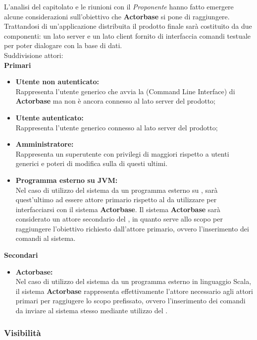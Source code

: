 \documentclass{scalatekids-article}
\begin{document}
L'analisi del capitolato e le riunioni con il \textit{Proponente} hanno fatto emergere
alcune considerazioni sull'obiettivo che \textbf{Actorbase} si pone di raggiungere.
Trattandosi di un'applicazione distribuita il prodotto finale sarà costituito
da due  componenti: un lato server e un lato client fornito di interfaccia
comandi testuale per poter dialogare con la base di dati.\\ Suddivisione attori:\\
\textbf{Primari}
\begin{itemize}
\item\textbf{Utente non autenticato:}\\
  Rappresenta l'utente generico che avvia la  (Command Line Interface) di \textbf{Actorbase} ma non è ancora connesso al lato server del prodotto;
\item\textbf{Utente autenticato:}\\
  Rappresenta l'utente generico connesso al lato server del prodotto;
\item\textbf{Amministratore:}\\
  Rappresenta un superutente con privilegi di  maggiori rispetto a utenti generici e poteri di modifica sulla  di questi ultimi.
\item\textbf{Programma esterno su JVM:}\\
  Nel caso di utilizzo del sistema da un programma esterno su , sarà quest'ultimo ad essere attore primario rispetto al  da utilizzare per
  interfacciarsi con il sistema \textbf{Actorbase}. Il sistema \textbf{Actorbase} sarà considerato un attore secondario del , in quanto serve allo scopo
  per raggiungere l'obiettivo richiesto dall'attore primario, ovvero l'inserimento dei comandi al sistema.
\end{itemize}
\textbf{Secondari}
\begin{itemize}
\item\textbf{Actorbase:}\\
  Nel caso di utilizzo del sistema da un programma esterno in linguaggio Scala, il sistema \textbf{Actorbase} rappresenta effettivamente l'attore necessario agli attori primari per raggiugere
  lo scopo prefissato, ovvero l'inserimento dei comandi da inviare al sistema stesso mediante utilizzo del .
\end{itemize}

\subsubsection{Visibilità}
\label{sec:visibilità}
\end{document}
